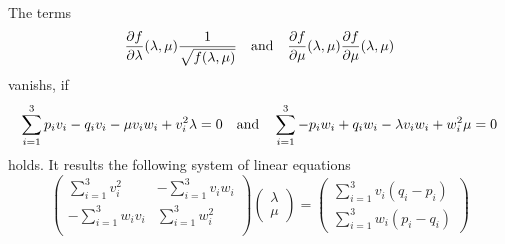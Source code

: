 The terms
\begin{equation*}
\dfrac{\partial f}{\partial \lambda}(\lambda, \mu)
	\dfrac{1}{\sqrt{f(\lambda, \mu)}}
\quad \textnormal{and} \quad
\dfrac{\partial f}{\partial \mu}(\lambda, \mu)
	\dfrac{\partial f}{\partial \mu}(\lambda, \mu)
\end{equation*}
vanishs, if
\begin{equation*}
\sum_{i=1}^3 p_i v_i - q_i v_i - \mu v_i w_i + v_i^2 \lambda = 0
\quad \textnormal{and} \quad
\sum_{i=1}^3 - p_i w_i + q_i w_i - \lambda v_i w_i + w_i^2 \mu = 0
\end{equation*}
holds. It results the following system of linear equations
\begin{equation*}
\begin{pmatrix}
\sum_{i=1}^3 v_i^2 & - \sum_{i=1}^3 v_i w_i \\
- \sum_{i=1}^3 w_i v_i & \sum_{i=1}^3 w_i^2 \\
\end{pmatrix}
\begin{pmatrix}
\lambda \\ \mu
\end{pmatrix}
=
\begin{pmatrix}
\sum_{i=1}^3 v_i (q_i - p_i) \\
\sum_{i=1}^3 w_i (p_i - q_i)
\end{pmatrix}
\end{equation*}
